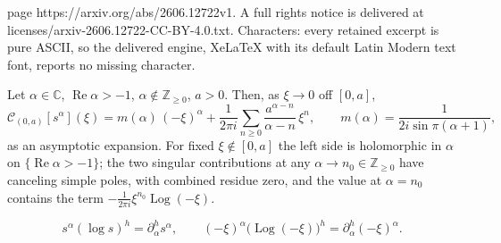 \documentclass[10pt,a4paper]{amsart}
\newcommand{\Cau}{\mathcal{C}}
\newcommand{\C}{\mathbb{C}}
\newcommand{\Log}{\operatorname{Log}}
\newcommand{\Real}{\operatorname{Re}}
\newcommand{\Z}{\mathbb{Z}}
\begin{document}
page https://arxiv.org/abs/2606.12722v1. A full rights notice is delivered at licenses/arxiv-2606.12722-CC-BY-4.0.txt. Characters: every retained excerpt is pure ASCII, so the delivered engine, XeLaTeX with its default Latin Modern text font, reports no missing character.
\begin{lemma}\label{lem:model}
Let $\alpha\in\C$, $\Real\alpha>-1$, $\alpha\notin\Z_{\ge0}$, $a>0$. Then, as
$\xi\to0$ off $[0,a]$,
\begin{equation}\label{eq:model}
  \Cau_{(0,a)}[s^{\alpha}](\xi)
  =m(\alpha)\,(-\xi)^{\alpha}
   +\frac{1}{2\pi i}\sum_{n\ge0}\frac{a^{\alpha-n}}{\alpha-n}\,\xi^{n},
   \qquad m(\alpha)=\frac{1}{2i\sin\pi(\alpha+1)},
\end{equation}
as an asymptotic expansion. For fixed $\xi\notin[0,a]$ the left side is
holomorphic in $\alpha$ on $\{\Real\alpha>-1\}$; the two singular contributions
at any $\alpha\to n_0\in\Z_{\ge0}$ have canceling simple poles, with combined
residue zero, and the value at $\alpha=n_0$ contains the term
$-\tfrac{1}{2\pi i}\xi^{n_0}\Log(-\xi)$.
\end{lemma}

\begin{equation}\label{eq:dalpha}
  s^{\alpha}(\log s)^{h}=\partial_\alpha^{h}s^{\alpha},
  \qquad
  (-\xi)^{\alpha}\bigl(\Log(-\xi)\bigr)^{h}=\partial_\alpha^{h}(-\xi)^{\alpha}.
\end{equation}
\end{document}
